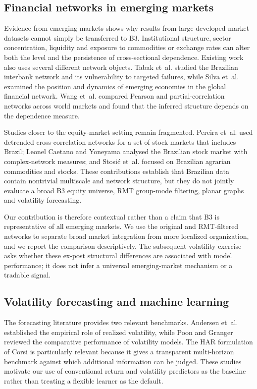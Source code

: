 \subsection{Financial networks in emerging markets}

Evidence from emerging markets shows why results from large developed-market datasets cannot simply be transferred to B3. Institutional structure, sector concentration, liquidity and exposure to commodities or exchange rates can alter both the level and the persistence of cross-sectional dependence. Existing work also uses several different network objects. Tabak et~al. \cite{tabak_2010_topology} studied the Brazilian interbank network and its vulnerability to targeted failures, while Silva et~al. \cite{silva_2016_structure} examined the position and dynamics of emerging economies in the global financial network. Wang et~al. \cite{wang_2018_correlation} compared Pearson and partial-correlation networks across world markets and found that the inferred structure depends on the dependence measure.

Studies closer to the equity-market setting remain fragmented. Pereira et~al. \cite{pereira_2019_multiscale} used detrended cross-correlation networks for a set of stock markets that includes Brazil; Leonel Caetano and Yoneyama \cite{leonel_2022_brazilian} analysed the Brazilian stock market with complex-network measures; and Stosi{\'c} et~al. \cite{stosic_2015_correlations} focused on Brazilian agrarian commodities and stocks. These contributions establish that Brazilian data contain nontrivial multiscale and network structure, but they do not jointly evaluate a broad B3 equity universe, RMT group-mode filtering, planar graphs and volatility forecasting.

Our contribution is therefore contextual rather than a claim that B3 is representative of all emerging markets. We use the original and RMT-filtered networks to separate broad market integration from more localized organization, and we report the comparison descriptively. The subsequent volatility exercise asks whether these ex-post structural differences are associated with model performance; it does not infer a universal emerging-market mechanism or a tradable signal.

\subsection{Volatility forecasting and machine learning}

The forecasting literature provides two relevant benchmarks. Andersen et~al. \cite{andersen_2003_modeling} established the empirical role of realized volatility, while Poon and Granger \cite{poon_granger_2003} reviewed the comparative performance of volatility models. The HAR formulation of Corsi \cite{corsi_2009_simple} is particularly relevant because it gives a transparent multi-horizon benchmark against which additional information can be judged. These studies motivate our use of conventional return and volatility predictors as the baseline rather than treating a flexible learner as the default.

